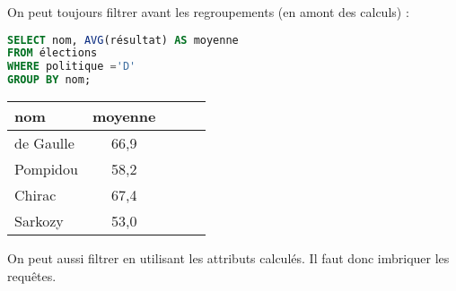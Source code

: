 \medskip

On peut toujours filtrer avant les regroupements (en amont des calculs) :

\medskip

\begin{minipage}{0.6\linewidth}
\begin{lstlisting}[language=SQL]
SELECT nom, AVG(résultat) AS moyenne 
FROM élections 
WHERE politique ='D'
GROUP BY nom;
\end{lstlisting}
\end{minipage}
\begin{minipage}{0.4\linewidth}
\begin{center}
\begin{tabular}{|l|c|c|c|c|}
\hline
{\bf nom} & {\bf moyenne}\\
  \hline
de Gaulle &66,9 \\
Pompidou &58,2\\
Chirac &67,4\\
Sarkozy &53,0\\
\hline
\end{tabular}
\end{center}
\end{minipage}

\medskip

On peut aussi filtrer en utilisant les attributs calculés. Il faut donc imbriquer les requêtes.

\medskip

